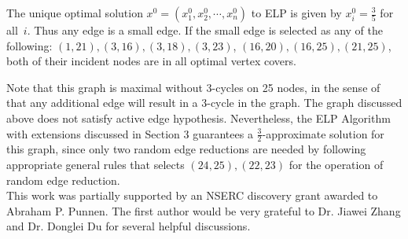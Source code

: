 \documentclass[12pt]{article}
\begin{document}
The unique optimal solution $x^0=(x_1^0, x_2^0,\cdots,x_n^0)$ to ELP is given by
$x^0_i=\frac{3}{5}$ for all~$i$. Thus any edge is a small edge. If
the small edge is selected as any of the following: $(1, 21), (3,
16),  (3, 18), (3, 23)$, $(16, 20), (16, 25),  (21, 25)$, both of
their incident nodes are in all optimal vertex covers.

\vskip 5pt

Note that this graph is maximal without 3-cycles on 25
nodes, in the sense of that any additional edge will result in a
3-cycle in the graph. The graph discussed above does not satisfy
active edge hypothesis. Nevertheless,   the ELP Algorithm with
extensions discussed in Section 3 guarantees a $\frac 3
2$-approximate
solution for this graph, since only two random edge reductions are
 needed by following appropriate general rules that selects
 $(24, 25), (22, 23)$ for the operation of random edge reduction. \\





 This work was partially
supported by an NSERC discovery grant awarded to Abraham P. Punnen.
The first author would be very grateful to Dr. Jiawei Zhang and Dr.
Donglei Du for several helpful discussions.
\end{document}
